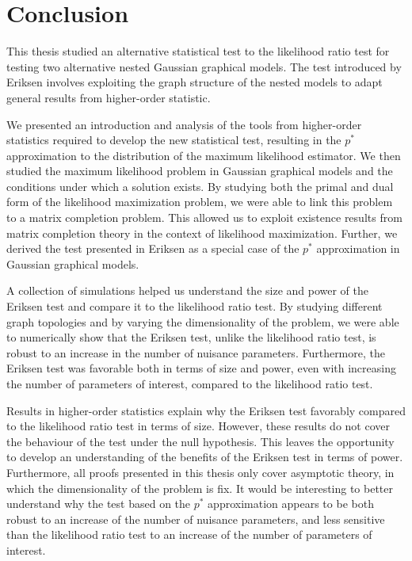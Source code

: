 \section{Conclusion}

This thesis studied an alternative statistical test to the likelihood ratio test for testing two alternative nested Gaussian graphical models. The test introduced by Eriksen \cite{eriksen1996tests} involves exploiting the graph structure of the nested models to adapt general results from higher-order statistic.

We presented an introduction and analysis of the tools from higher-order statistics required to develop the new statistical test, resulting in the $p^*$ approximation to the distribution of the maximum likelihood estimator. We then studied the maximum likelihood problem in Gaussian graphical models and the conditions under which a solution exists. By studying both the primal and dual form of the likelihood maximization problem, we were able to link this problem to a matrix completion problem. This allowed us to exploit existence results from matrix completion theory in the context of likelihood maximization. Further, we derived the test presented in Eriksen \cite{eriksen1996tests} as a special case of the $p^*$ approximation in Gaussian graphical models.

A collection of simulations helped us understand the size and power of the Eriksen test and compare it to the likelihood ratio test. By studying different graph topologies and by varying the dimensionality of the problem, we were able to numerically show that the Eriksen test, unlike the likelihood ratio test, is robust to an increase in the number of nuisance parameters. Furthermore, the Eriksen test was favorable both in terms of size and power, even with increasing the number of parameters of interest, compared to the likelihood ratio test.

Results in higher-order statistics explain why the Eriksen test favorably compared to the likelihood ratio test in terms of size. However, these results do not cover the behaviour of the test under the null hypothesis. This leaves the opportunity to develop an understanding of the benefits of the Eriksen test in terms of power. Furthermore, all proofs presented in this thesis only cover asymptotic theory, in which the dimensionality of the problem is fix. It would be interesting to better understand why the test based on the $p^*$  approximation appears to be both robust to an increase of the number of nuisance parameters, and less sensitive than the likelihood ratio test to an increase of the number of parameters of interest. 